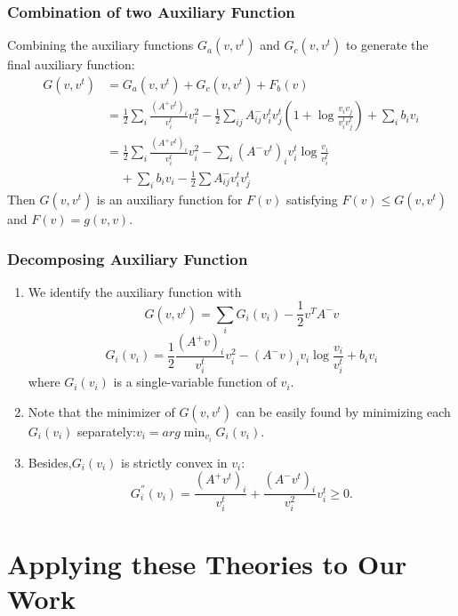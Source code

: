 \documentclass{beamer}
\begin{document}
\begin{frame}\frametitle{Combination of two Auxiliary Function}
Combining the auxiliary functions $G_a(v,v^t)$ and $G_c(v,v^t)$ to generate the final auxiliary function:
\begin{equation}\label{eq15}
\begin{split}
G(v,v^t)&=G_a(v,v^t)+G_c(v,v^t)+F_b(v)\\
&=\frac{1}{2}\sum_i \frac{(A^+v^t)_i}{v_i^t}v_i^2-\frac{1}{2}\sum_{ij}A_{ij}^-v_i^tv_j^t(1+\log\frac{v_iv_j}{v_i^t v_j^t})+\sum_i{b_iv_i}\\
&=\frac{1}{2}\sum_i \frac{(A^+v^t)_i}{v_i^t}v_i^2-\sum_i(A^-v^t)_iv_i^t\log\frac{v_i}{v_i^t}\\
&\;\;\;\;+\sum_i{b_iv_i}-\frac{1}{2}\sum{A_{ij}^-v_i^tv_j^t}
\end{split}
\end{equation}
Then $G(v,v^t)$ is an auxiliary function for $F(v)$ satisfying $F(v) \leq G(v,v^t)$ and $F(v)=g(v,v)$.
\end{frame}


\begin{frame}\frametitle{Decomposing Auxiliary Function}
\begin{enumerate}
\item We identify the auxiliary function with
\begin{equation}\label{eq16}
G(v,v^t)=\sum_i{G_i(v_i)}-\frac{1}{2}v^TA^-v
\end{equation}
\begin{equation}\label{eq17}
G_i(v_i)=\frac{1}{2}\frac{(A^+v)_i}{v_i^t}v_i^2-(A^-v)_iv_i\log\frac{v_i}{v_i^t}+b_iv_i
\end{equation}
where $G_i(v_i)$ is a single-variable function of $v_i$.\\
\item Note that the minimizer of $G(v,v^t)$ can be easily found by minimizing each $G_i(v_i)$ separately:$v_i=arg \min_{v_i}G_i(v_i)$.\\
\item Besides,$G_i(v_i)$ is strictly convex in $v_i$:
\begin{equation}
G_i^{''}(v_i)=\frac{(A^+v^t)_i}{v_i^t}+\frac{(A^-v^t)_i}{v_i^2}v_i^t\geq 0.
\end{equation}
\end{enumerate}
\end{frame}


\section{Applying these Theories to Our Work}
\end{document}
